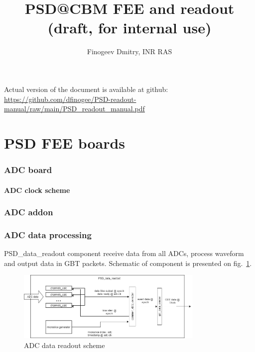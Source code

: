 \documentclass{article}
\title{PSD@CBM FEE and readout (draft, for internal use)}
\author{Finogeev Dmitry, INR RAS}
\begin{document}
\maketitle

Actual version of the document is available at github:
\newline
\url{https://github.com/dfinogee/PSD-readout-manual/raw/main/PSD_readout_manual.pdf}



\tableofcontents


\newpage
\part{PSD FEE boards}


\section{ADC board}

\subsection{ADC clock scheme}\label{sec:adc-clock}

\section{ADC addon}



\section{ADC data processing}
PSD\_data\_readout component receive data from all ADCs, process waveform and output data in GBT packets. Schematic of component is presented on fig.~\ref{fig:1}.

\begin{figure}[H]
	\centering 
	\includegraphics[width=0.8\textwidth]{ADC_readout.png}
	\caption{\label{fig:1} ADC data readout scheme}
\end{figure}
\end{document}
